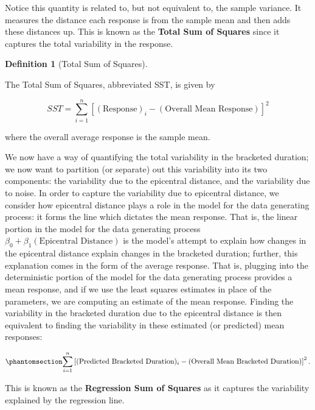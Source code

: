 \documentclass[
  letterpaper,
  DIV=11,
  numbers=noendperiod]{scrreprt}
\theoremstyle{definition}
\newtheorem{definition}{Definition}[chapter]
\theoremstyle{definition}
\theoremstyle{plain}
\theoremstyle{remark}
\begin{document}
Notice this quantity is related to, but not equivalent to, the sample
variance. It measures the distance each response is from the sample mean
and then adds these distances up. This is known as the \textbf{Total Sum
of Squares} since it captures the total variability in the response.

\begin{definition}[Total Sum of
Squares]\protect\hypertarget{def-sst}{}\label{def-sst}

The Total Sum of Squares, abbreviated SST, is given by

\[SST = \sum_{i=1}^{n} \left[(\text{Response})_i - (\text{Overall Mean Response})\right]^2\]

where the overall average response is the sample mean.

\end{definition}

We now have a way of quantifying the total variability in the bracketed
duration; we now want to partition (or separate) out this variability
into its two components: the variability due to the epicentral distance,
and the variability due to noise. In order to capture the variability
due to epicentral distance, we consider how epicentral distance plays a
role in the model for the data generating process: it forms the line
which dictates the mean response. That is, the linear portion in the
model for the data generating process
\(\beta_0 + \beta_1 (\text{Epicentral Distance})\) is the model's
attempt to explain how changes in the epicentral distance explain
changes in the bracketed duration; further, this explanation comes in
the form of the average response. That is, plugging into the
deterministic portion of the model for the data generating process
provides a mean response, and if we use the least squares estimates in
place of the parameters, we are computing an estimate of the mean
response. Finding the variability in the bracketed duration due to the
epicentral distance is then equivalent to finding the variability in
these estimated (or predicted) mean responses:

\begin{equation}\phantomsection\label{eq-regquality-ssr}{\sum_{i=1}^{n} \left[(\text{Predicted Bracketed Duration})_i - (\text{Overall Mean Bracketed Duration})\right]^2.}\end{equation}

This is known as the \textbf{Regression Sum of Squares} as it captures
the variability explained by the regression line.
\end{document}
